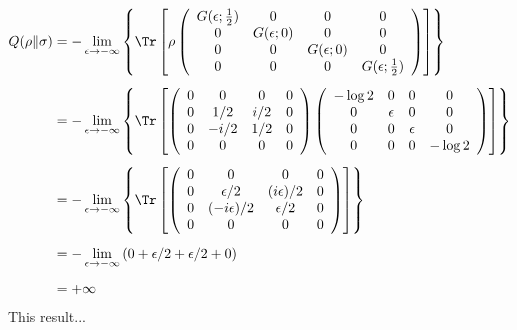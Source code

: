 \begin{align}
Q(\rho \| \sigma) &=-\lim_{\epsilon \to -\infty} \left\{ \Tr \left[
\rho
\left(
\begin{array}{cccc}
 G(\epsilon;\frac{1}{2}) & 0 & 0 & 0 \\
 0 &  G(\epsilon;0) & 0 & 0 \\
 0 & 0 &  G(\epsilon;0) & 0 \\
 0 & 0 & 0 &  G(\epsilon;\frac{1}{2}) \\
\end{array}
\right) \right] \right\} \nonumber \\[0.5em]
&= -\lim_{\epsilon \to -\infty} \left\{ \Tr \left[
\left(
\begin{array}{cccc}
 0 & 0 & 0 & 0 \\
 0 & 1/2 & i/2 & 0 \\
 0 & -i/2 & 1/2 & 0 \\
 0 & 0 & 0 & 0 \\
\end{array}
\right)
\left(
\begin{array}{cccc}
 -\log2 & 0 & 0 & 0 \\
 0 &  \epsilon & 0 & 0 \\
 0 & 0 &  \epsilon & 0 \\
 0 & 0 & 0 &  -\log2 \\
\end{array}
\right) \right] \right\} \nonumber \\[0.5em]
&=
-\lim_{\epsilon \to -\infty} \left\{ \Tr \left[
\left(
\begin{array}{cccc}
 0 & 0 & 0 & 0 \\
 0 & \epsilon /2 & (i\epsilon)/2 & 0 \\
 0 & (-i\epsilon)/2 & \epsilon/2 & 0 \\
 0 & 0 & 0 & 0 \\
\end{array}
\right)
\right] \right\} \nonumber \\[0.5em]
&=-\lim_{\epsilon \to -\infty} \left(0+\epsilon/2+\epsilon/2+0\right) \nonumber \\[0.5em]
&=+\infty 
\end{align}
This result...